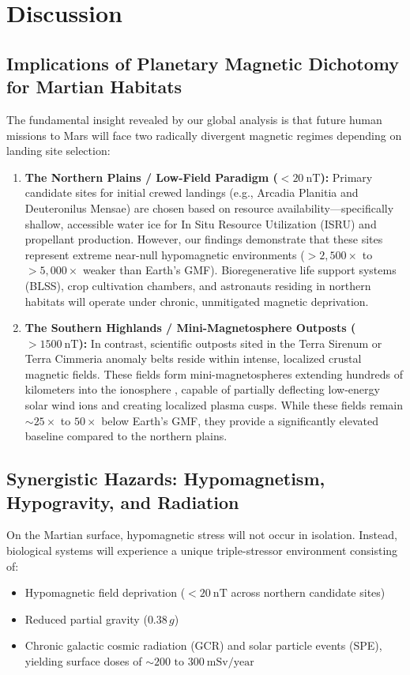 \section{Discussion}
\label{sec:discussion}

\subsection{Implications of Planetary Magnetic Dichotomy for Martian Habitats}
The fundamental insight revealed by our global analysis is that future human missions to Mars will face two radically divergent magnetic regimes depending on landing site selection:

\begin{enumerate}
    \item \textbf{The Northern Plains / Low-Field Paradigm ($< \SI{20}{\nano\tesla}$):} Primary candidate sites for initial crewed landings (e.g., Arcadia Planitia and Deuteronilus Mensae) are chosen based on resource availability—specifically shallow, accessible water ice for In Situ Resource Utilization (ISRU) and propellant production. However, our findings demonstrate that these sites represent extreme near-null hypomagnetic environments ($>2,500\times$ to $>5,000\times$ weaker than Earth's GMF). Bioregenerative life support systems (BLSS), crop cultivation chambers, and astronauts residing in northern habitats will operate under chronic, unmitigated magnetic deprivation.
    \item \textbf{The Southern Highlands / Mini-Magnetosphere Outposts ($> \SI{1500}{\nano\tesla}$):} In contrast, scientific outposts sited in the Terra Sirenum or Terra Cimmeria anomaly belts reside within intense, localized crustal magnetic fields. These fields form mini-magnetospheres extending hundreds of kilometers into the ionosphere \citep{Mitchell2001}, capable of partially deflecting low-energy solar wind ions and creating localized plasma cusps. While these fields remain $\sim 25\times$ to $50\times$ below Earth's GMF, they provide a significantly elevated baseline compared to the northern plains.
\end{enumerate}

\subsection{Synergistic Hazards: Hypomagnetism, Hypogravity, and Radiation}
On the Martian surface, hypomagnetic stress will not occur in isolation. Instead, biological systems will experience a unique triple-stressor environment consisting of:
\begin{itemize}
    \item Hypomagnetic field deprivation ($< \SI{20}{\nano\tesla}$ across northern candidate sites)
    \item Reduced partial gravity ($0.38\,g$)
    \item Chronic galactic cosmic radiation (GCR) and solar particle events (SPE), yielding surface doses of $\sim 200\text{ to }\SI{300}{\milli\sievert}/\text{year}$
\end{itemize}

